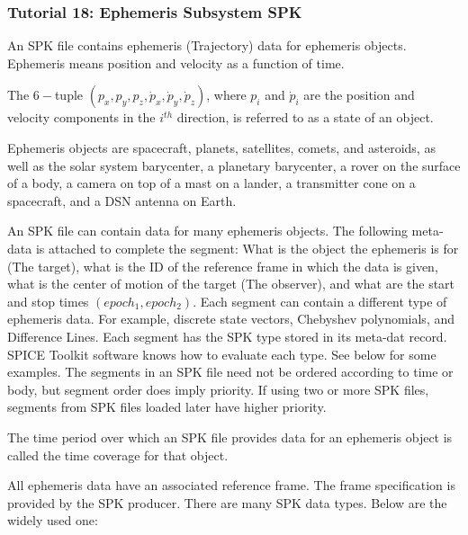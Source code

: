 \documentclass[crop=false,class=article,oneside]{standalone}
\begin{document}
            \subsubsection{Tutorial 18: Ephemeris Subsystem SPK}
            An SPK file contains ephemeris (Trajectory) data for ephemeris objects. Ephemeris means position and velocity as a function of time.
            \begin{definition}
            The $6-$tuple $(p_{x},p_{y},p_{z},\dot{p}_{x},\dot{p}_{y},\dot{p}_{z})$, where $p_{i}$ and $\dot{p}_{i}$ are the position and velocity components in the $i^{th}$ direction, is referred to as a state of an object.
            \end{definition}
            \begin{definition}
            Ephemeris objects are spacecraft, planets, satellites, comets, and asteroids, as well as the solar system barycenter, a planetary barycenter, a rover on the surface of a body, a camera on top of a mast on a lander, a transmitter cone on a spacecraft, and a DSN antenna on Earth.
            \end{definition}
            An SPK file can contain data for many ephemeris objects.
            The following meta-data is attached to complete the segment: What is the object the ephemeris is for (The target), what is the ID of the reference frame in which the data is given, what is the center of motion of the target (The observer), and what are the start and stop times $(epoch_1, epoch_2)$. Each segment can contain a different type of ephemeris data. For example, discrete state vectors, Chebyshev polynomials, and Difference Lines. Each segment has the SPK type stored in its meta-dat record. SPICE Toolkit software knows how to evaluate each type. See below for some examples. The segments in an SPK file need not be ordered according to time or body, but segment order does imply priority. If using two or more SPK files, segments from SPK files loaded later have higher priority. 
            \begin{definition}
            The time period over which an SPK file provides data for an ephemeris object is called the time coverage for that object.
            \end{definition}
            All ephemeris data have an associated reference frame. The frame specification is provided by the SPK producer. There are many SPK data types. Below are the widely used one:
\end{document}
